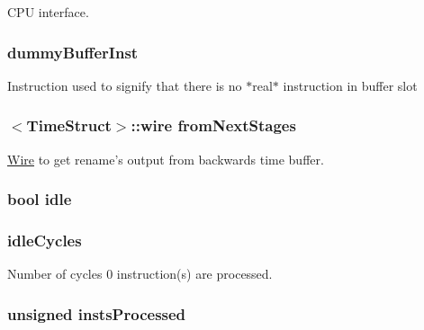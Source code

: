 \label{classPipelineStage_a41d682c28d0f49e04393c52815808782}
CPU interface. \hypertarget{classPipelineStage_a09dc4a08ace7d6e74531ffff1ba5d905}{
\subsubsection[{dummyBufferInst}]{ {\bf dummyBufferInst}}}
\label{classPipelineStage_a09dc4a08ace7d6e74531ffff1ba5d905}
Instruction used to signify that there is no $\ast$real$\ast$ instruction in buffer slot \hypertarget{classPipelineStage_a728ac6e701ecba86ee9e8d15ae07d53f}{
\subsubsection[{fromNextStages}]{$<${\bf TimeStruct}$>$::wire {\bf fromNextStages}}}
\label{classPipelineStage_a728ac6e701ecba86ee9e8d15ae07d53f}
\hyperlink{classWire}{Wire} to get rename's output from backwards time buffer. \hypertarget{classPipelineStage_a97808a9870039f4168da10ecfb5dc472}{
\subsubsection[{idle}]{\setlength{\rightskip}{0pt plus 5cm}bool {\bf idle}}}
\label{classPipelineStage_a97808a9870039f4168da10ecfb5dc472}
\hypertarget{classPipelineStage_a42e0f4c18fdb8ef7504f5c45d697fb14}{
\subsubsection[{idleCycles}]{ {\bf idleCycles}}}
\label{classPipelineStage_a42e0f4c18fdb8ef7504f5c45d697fb14}
Number of cycles 0 instruction(s) are processed. \hypertarget{classPipelineStage_a4ac908fc89a76ee30c0af235353b6c2f}{
\subsubsection[{instsProcessed}]{\setlength{\rightskip}{0pt plus 5cm}unsigned {\bf instsProcessed}}}
